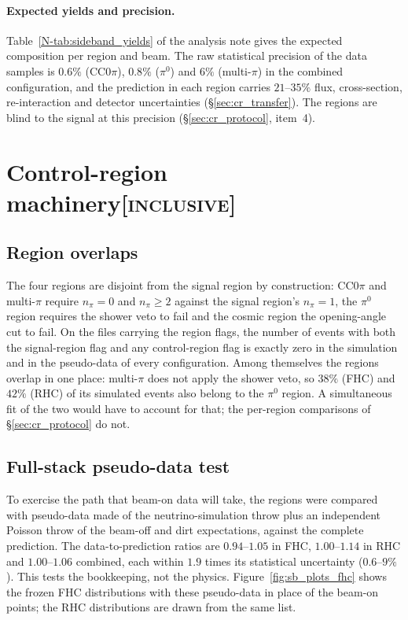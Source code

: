 \documentclass[11pt,a4paper]{article}
\newcommand{\noteref}[2]{#1~\ref{N-#2} of the analysis note}
\newcommand{\scopetag}[1]{\hfill{\normalfont\small\textsc{[#1]}}}
\begin{document}
\paragraph{Expected yields and precision.}
\noteref{Table}{tab:sideband_yields} gives the expected composition per region and beam. The raw
statistical precision of the data samples is $0.6\%$ (CC$0\pi$), $0.8\%$ ($\pi^0$) and $6\%$ (multi-$\pi$) in
the combined configuration, and the prediction in each region carries $21$--$35\%$ flux, cross-section,
re-interaction and detector uncertainties (\S\ref{sec:cr_transfer}). The regions are blind to the signal
at this precision (\S\ref{sec:cr_protocol}, item~4).


\section[Control-region machinery]{Control-region machinery\scopetag{inclusive}}
\label{sec:cr_machinery}

\subsection{Region overlaps}
\label{sec:cr_overlap}
The four regions are disjoint from the signal region by construction: CC$0\pi$ and multi-$\pi$ require
$n_\pi=0$ and $n_\pi\ge2$ against the signal region's $n_\pi=1$, the $\pi^0$ region requires the shower
veto to fail and the cosmic region the opening-angle cut to fail. On the files carrying the region
flags, the number of events with both the signal-region flag and any control-region flag is exactly zero
in the simulation and in the pseudo-data of every configuration. Among themselves the regions overlap in
one place: multi-$\pi$ does not apply the shower veto, so $38\%$ (FHC) and $42\%$ (RHC) of its
simulated events also belong to the $\pi^0$ region. A simultaneous fit of the two would have to account
for that; the per-region comparisons of \S\ref{sec:cr_protocol} do not.

\subsection{Full-stack pseudo-data test}
\label{sec:cr_fullstack}
To exercise the path that beam-on data will take, the regions were compared with pseudo-data made of the
neutrino-simulation throw plus an independent Poisson throw of the beam-off and dirt expectations,
against the complete prediction. The data-to-prediction ratios are $0.94$--$1.05$ in FHC, $1.00$--$1.14$
in RHC and $1.00$--$1.06$ combined, each within $1.9$ times its statistical uncertainty ($0.6$--$9\%$). This tests
the bookkeeping, not the physics. Figure~\ref{fig:sb_plots_fhc} shows the frozen FHC distributions
with these pseudo-data in place of the beam-on points; the RHC distributions are drawn from the same
list.
\end{document}
